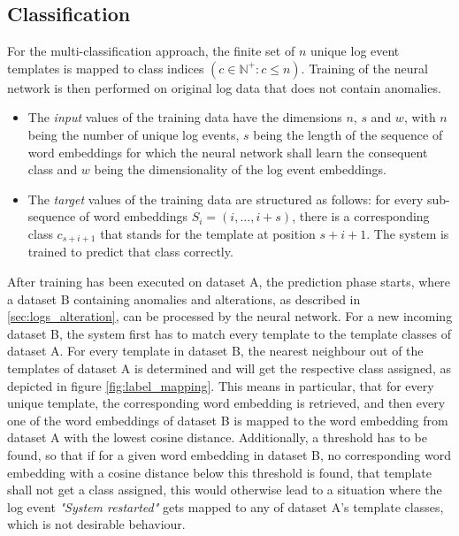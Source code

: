 \subsection{Classification \label{sec:classification}}
For the multi-classification approach, the finite set of $n$ unique log event templates is mapped to class indices $(c \in \mathbb{N}^{+}: c \leq n)$. Training of the neural network is then performed on original log data that does not contain anomalies.
\begin{itemize}
\setlength\itemsep{-0.5em}
	\item The \textit{input} values of the training data have the dimensions $n$, $s$ and $w$, with $n$ being the number of unique log events, $s$ being the length of the sequence of word embeddings for which the neural network shall learn the consequent class and $w$ being the dimensionality of the log event embeddings.
	\item The \textit{target} values of the training data are structured as follows: for every sub-sequence of word embeddings $S_i = (i, ..., i+s)$, there is a corresponding class $c_{s+i+1}$ that stands for the template at position $s+i+1$. The system is trained to predict that class correctly.
\end{itemize}

After training has been executed on dataset A, the prediction phase starts, where a dataset B containing anomalies and alterations, as described in \ref{sec:logs_alteration}, can be processed by the neural network. For a new incoming dataset B, the system first has to match every template to the template classes of dataset A. For every template in dataset B, the nearest neighbour out of the templates of dataset A is determined and will get the respective class assigned, as depicted in figure \ref{fig:label_mapping}. This means in particular, that for every unique template, the corresponding word embedding is retrieved, and then every one of the word embeddings of dataset B is mapped to the word embedding from dataset A with the lowest cosine distance. Additionally, a threshold has to be found, so that if for a given word embedding in dataset B, no corresponding word embedding with a cosine distance below this threshold is found, that template shall not get a class assigned, this would otherwise lead to a situation where the log event \textit{"System restarted"} gets mapped to any of dataset A's template classes, which is not desirable behaviour.

